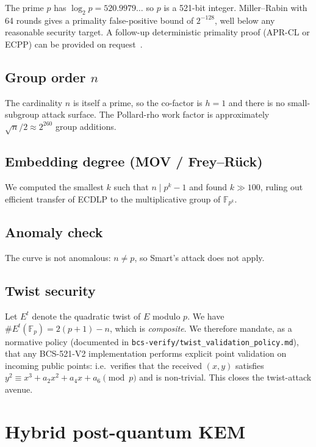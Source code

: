 \documentclass[11pt,a4paper]{article}
\theoremstyle{plain}
\theoremstyle{definition}
\newcommand{\F}{\mathbb{F}}
\newcommand{\BCSV}{\textsf{BCS\hbox{-}521\hbox{-}V2}}
\begin{document}
The prime $p$ has $\log_2 p = 520.9979\ldots$ so $p$ is a 521-bit
integer. Miller--Rabin with 64 rounds gives a primality false-positive
bound of $2^{-128}$, well below any reasonable security target. A
follow-up deterministic primality proof (APR-CL or ECPP) can be
provided on request~\cite{ECPP}.

\subsection{Group order $n$}

The cardinality $n$ is itself a prime, so the co-factor is $h = 1$
and there is no small-subgroup attack surface. The Pollard-rho work
factor is approximately $\sqrt{n}/2 \approx 2^{260}$ group additions.

\subsection{Embedding degree (MOV / Frey--R\"uck)}

We computed the smallest $k$ such that $n \mid p^{k} - 1$ and found
$k \gg 100$, ruling out efficient transfer of ECDLP to the multiplicative
group of $\F_{p^k}$.

\subsection{Anomaly check}

The curve is not anomalous: $n \ne p$, so Smart's attack
\cite{Smart1999} does not apply.

\subsection{Twist security}

Let $E^{t}$ denote the quadratic twist of $E$ modulo $p$. We have
$\#E^{t}(\F_p) = 2(p+1) - n$, which is \emph{composite}. We
therefore mandate, as a normative policy
(documented in \texttt{bcs-verify/twist\_validation\_policy.md}),
that any \BCSV{} implementation performs
explicit point validation on incoming public points: i.e.\ verifies
that the received $(x, y)$ satisfies $y^2 \equiv x^3 + a_2 x^2 + a_4 x + a_6
\pmod{p}$ and is non-trivial. This closes the twist-attack avenue.

\section{Hybrid post-quantum KEM}
\label{sec:hybrid}
\end{document}
